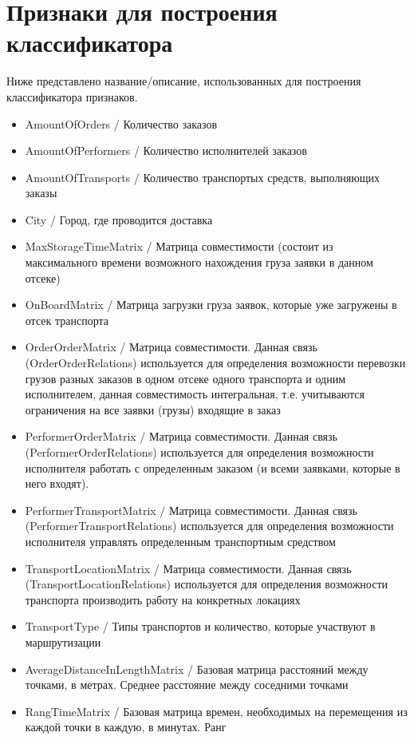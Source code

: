 \documentclass[specification,annotation]{itmo-student-thesis}
\begin{document}
\chapter{Признаки для построения классификатора}

Ниже представлено название/описание, использованных для построения классификатора признаков.

\begin{itemize}
	\item AmountOfOrders / Количество заказов
	\item AmountOfPerformers / Количество исполнителей заказов
	\item AmountOfTransports / Количество транспортых средств, выполняющих заказы
	\item City / Город, где проводится доставка
	\item MaxStorageTimeMatrix / Матрица совместимости (состоит из максимального времени возможного нахождения груза заявки в данном отсеке)
	\item OnBoardMatrix / Матрица загрузки груза заявок, которые уже загружены в отсек транспорта
	\item OrderOrderMatrix / Матрица совместимости. Данная связь (OrderOrderRelations) используется для определения возможности перевозки грузов разных заказов в одном отсеке одного транспорта и одним исполнителем, данная совместимость интегральная, т.е. учитываются ограничения на все заявки (грузы) входящие в заказ
	\item PerformerOrderMatrix / Матрица совместимости. Данная связь (PerformerOrderRelations) используется для определения возможности исполнителя работать с определенным заказом (и всеми заявками, которые в него входят).
	\item PerformerTransportMatrix / Матрица совместимости. Данная связь (PerformerTransportRelations) используется для определения возможности исполнителя управлять определенным транспортным средством
	\item TransportLocationMatrix / Матрица совместимости. Данная связь (TransportLocationRelations) используется для определения возможности транспорта производить работу на конкретных локациях
	\item TransportType / Типы транспортов и количество, которые участвуют в маршрутизации
	\item AverageDistanceInLengthMatrix / Базовая матрица расстояний между точками, в метрах. Среднее расстояние между соседними точками
	\item RangTimeMatrix / Базовая матрица времен, необходимых на перемещения из каждой точки в каждую, в минутах. Ранг

\end{itemize}
\end{document}
